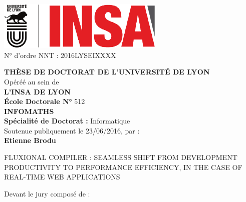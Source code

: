 \begin{center}
\includegraphics[width=8cm]{../resources/logos.pdf}%
\\[1em]


{N° d'ordre NNT : 2016LYSEIXXXX \hfill}

\vfill
{
  \fontsize{14pt}{16pt}\selectfont%

  {\large\textbf{\MakeUppercase{Thèse de doctorat de l'université de Lyon}}}\\[1em]

  Opéréé au sein de\\
  {\large\textbf{\MakeUppercase{L'INSA de Lyon}}}\\[1em]

  {\large\textbf{École Doctorale N° }512}\\
  {\large\textbf{\MakeUppercase{InfoMaths}}}\\[1em]

  {\large\textbf{Spécialité de Doctorat : }Informatique}\\[1em]

  Soutenue publiquement le 23/06/2016, par :\\
  {\large\textbf{Etienne Brodu}}\\[1em]
}

\vfill

\parbox{\linewidth}{%
\vspace{10pt}
\redline%
\vspace{10pt}
\secfont\fontsize{20pt}{25pt}\selectfont%
\MakeUppercase{Fluxional compiler : seamless shift from development productivity to performance efficiency, in the case of real-time web applications}%
\vspace{10pt}%
\redline%
\vspace{10pt}
}

\vfill

Devant le jury composé de : \\[1em]


\end{center}
